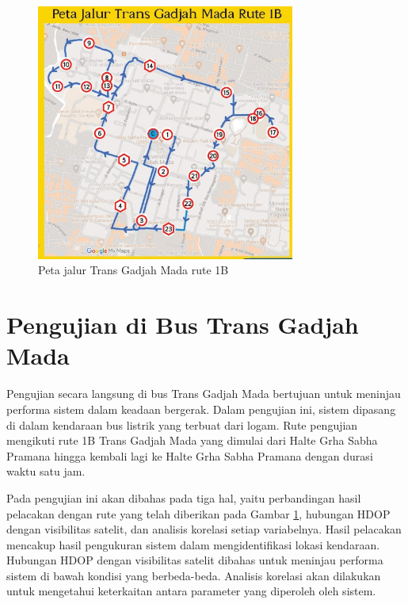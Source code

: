 \begin{figure}[H]
	\centering
	\includegraphics[width=8.5cm]{contents/chapter-4/pengujian-bergerak/Peta-Jalur-Rute-1B.jpg}
	\caption{Peta jalur Trans Gadjah Mada rute 1B}
	\label{Fig: peta-1b}
\end{figure}

\section{Pengujian di Bus Trans Gadjah Mada}
Pengujian secara langsung di bus Trans Gadjah Mada bertujuan untuk meninjau performa sistem dalam keadaan bergerak. Dalam pengujian ini, sistem dipasang di dalam kendaraan bus listrik yang terbuat dari logam. Rute pengujian mengikuti rute 1B Trans Gadjah Mada yang dimulai dari Halte Grha Sabha Pramana hingga kembali lagi ke Halte Grha Sabha Pramana dengan durasi waktu satu jam.

Pada pengujian ini akan dibahas pada tiga hal, yaitu perbandingan hasil pelacakan dengan rute yang telah diberikan pada Gambar \ref{Fig: peta-1b}, hubungan HDOP dengan visibilitas satelit, dan analisis korelasi setiap variabelnya. Hasil pelacakan mencakup hasil pengukuran sistem dalam mengidentifikasi lokasi kendaraan. Hubungan HDOP dengan visibilitas satelit dibahas untuk meninjau performa sistem di bawah kondisi yang berbeda-beda. Analisis korelasi akan dilakukan untuk mengetahui keterkaitan antara parameter yang diperoleh oleh sistem.

